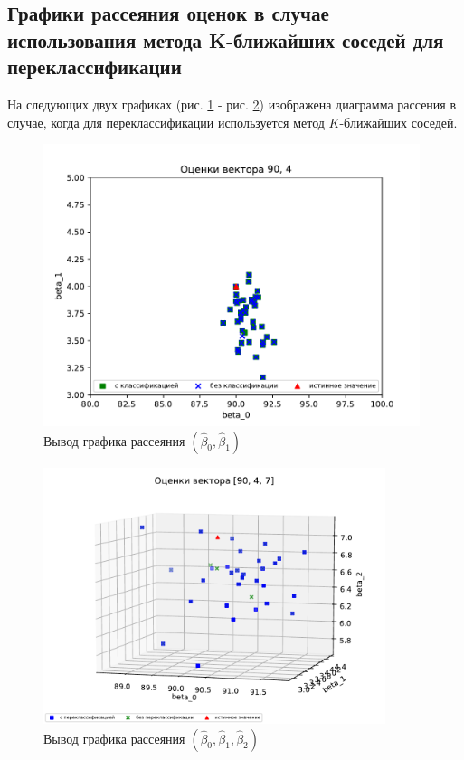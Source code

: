 \subsection{Графики рассеяния оценок в случае использования метода K-ближайших соседей для переклассификации}
На следующих двух графиках (рис. \ref{pic4} - рис. \ref{pic5}) изображена диаграмма рассения в случае, когда для переклассификации используется метод $K$-ближайших соседей.
\newpage
\begin{figure}[h]
    \centering
    \includegraphics[width=110mm]{../images/plot_90_4_with-without_(3).pdf}
    \caption{Вывод графика рассеяния $(\hat{\beta}_0,\hat{\beta}_1)$\label{overflow}}
    \label{pic4}
\end{figure}

\begin{figure}[h]
    \centering
    \includegraphics[width=100mm]{../images/plot_90_4_7_(4).pdf}
    \caption{Вывод графика рассеяния $(\hat{\beta}_0,\hat{\beta}_1, \hat{\beta}_2)$\label{overflow}}
    \label{pic5}
\end{figure}

